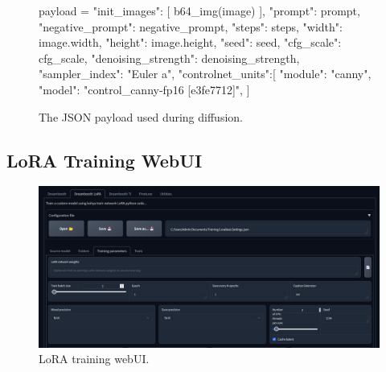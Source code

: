 \documentclass[preprint]{elsarticle}
\begin{document}
\begin{figure}
\begin{python}
	payload = {
		"init_images": [
		b64_img(image)
		],
		"prompt": prompt,
		"negative_prompt": negative_prompt,
		"steps": steps,
		"width": image.width,
		"height": image.height,
		"seed": seed,
		"cfg_scale": cfg_scale,
		"denoising_strength": denoising_strength,
		"sampler_index": "Euler a",
		"controlnet_units":[
		{
			"module": "canny",
			"model": "control_canny-fp16 [e3fe7712]",
		}
		]
	}
\end{python}
\caption{The JSON payload used during diffusion.}\label{fig:jsonpayload}
\end{figure}


\subsection{LoRA Training WebUI} \label{sec:lora_training_webui}

\begin{figure}[H]
	\centering
	\includegraphics[width=15cm, keepaspectratio]{img/project_img/lora.png} 
	\caption{LoRA training webUI.}
	\label{fig:lora-webui}
\end{figure}
\end{document}
